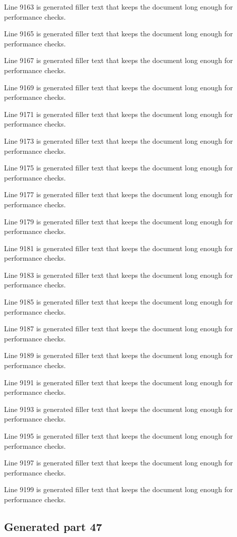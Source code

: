 Line 9163 is generated filler text that keeps the document long enough for performance checks.

Line 9165 is generated filler text that keeps the document long enough for performance checks.

Line 9167 is generated filler text that keeps the document long enough for performance checks.

Line 9169 is generated filler text that keeps the document long enough for performance checks.

Line 9171 is generated filler text that keeps the document long enough for performance checks.

Line 9173 is generated filler text that keeps the document long enough for performance checks.

Line 9175 is generated filler text that keeps the document long enough for performance checks.

Line 9177 is generated filler text that keeps the document long enough for performance checks.

Line 9179 is generated filler text that keeps the document long enough for performance checks.

Line 9181 is generated filler text that keeps the document long enough for performance checks.

Line 9183 is generated filler text that keeps the document long enough for performance checks.

Line 9185 is generated filler text that keeps the document long enough for performance checks.

Line 9187 is generated filler text that keeps the document long enough for performance checks.

Line 9189 is generated filler text that keeps the document long enough for performance checks.

Line 9191 is generated filler text that keeps the document long enough for performance checks.

Line 9193 is generated filler text that keeps the document long enough for performance checks.

Line 9195 is generated filler text that keeps the document long enough for performance checks.

Line 9197 is generated filler text that keeps the document long enough for performance checks.

Line 9199 is generated filler text that keeps the document long enough for performance checks.

\subsection{Generated part 47}

